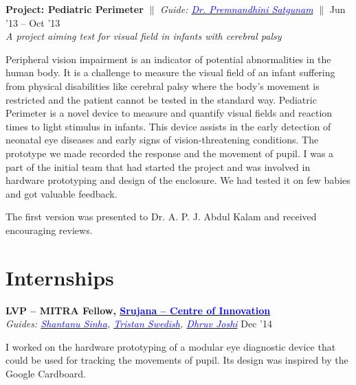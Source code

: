 \documentclass[margin,line]{res}
\newenvironment{list1}{
  \begin{list}{\ding{113}}{%
      \setlength{\itemsep}{0in}
      \setlength{\parsep}{0in} \setlength{\parskip}{0in}
      \setlength{\topsep}{0in} \setlength{\partopsep}{0in} 
      \setlength{\leftmargin}{0.17in}}}{\end{list}}
\begin{document}
\begin{resume}
\begin{list1}
\item[]\textbf{Project: Pediatric Perimeter} \hfill $\|$ \hfill {\em Guide: \href{http://www.lvpei.org/our-team/our-team-Premnandhini.php}{\textcolor{blue} {Dr. Premnandhini Satgunam}}} \hfill $\|$ \hfill {Jun '13 -- Oct '13} \\
\textit{A project aiming test for visual field in infants with cerebral palsy} 
\vspace{4pt}

\noindent Peripheral vision impairment is an indicator of potential abnormalities in the human body. It is a challenge to measure the visual field of an infant suffering from physical disabilities like cerebral palsy where the body's movement is restricted and the patient cannot be tested in the standard way. Pediatric Perimeter is a novel device to measure and quantify visual fields and reaction times to light stimulus in infants. This device assists in the early detection of neonatal eye diseases and early signs of vision-threatening conditions. 
The prototype we made recorded the response and the movement of pupil. I was a part of the initial team that had started the project and was involved in hardware prototyping and design of the enclosure. We had tested it on few babies and got valuable feedback. 

\noindent The first version was presented to Dr. A. P. J. Abdul Kalam and received encouraging reviews. 
\end{list1}

\section{\sc Internships}

{\bf LVP -- MITRA Fellow, \href{http://lvpmitra.com/}{\textcolor{blue}{Srujana -- Centre of Innovation}}} \hfill  \\
{\em Guides: \href{https://www.media.mit.edu/~sssinha}{\textcolor{blue}{Shantanu Sinha}}, \href{https://web.media.mit.edu/~tswedish/}{\textcolor{blue}{Tristan Swedish}}, \href{https://www.linkedin.com/in/derbedhruv}{\textcolor{blue}{Dhruv Joshi}}} \hfill {Dec '14} \\
\vspace*{-.13in}
\begin{list1}
\item[]
I worked on the hardware prototyping of a modular eye diagnostic device that could be used for tracking the movements of pupil. Its design was inspired by the Google Cardboard. 
\end{list1}


\end{resume}
\end{document}
